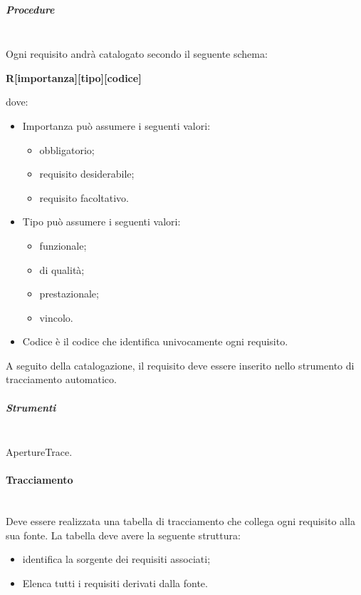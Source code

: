 \subparagraph{Procedure} \hfill \\
Ogni requisito andrà catalogato secondo il seguente schema:

\begin{center}
\textbf{R[importanza][tipo][codice]}
\end{center}
dove:
\begin{itemize}
\item Importanza può assumere i seguenti valori:
\begin{itemize}
\item {}  obbligatorio;
\item {} requisito desiderabile;
\item {} requisito facoltativo.
\end{itemize}
\item Tipo può assumere i seguenti valori:
\begin{itemize}
\item {} funzionale;
\item {} di qualità;
\item {} prestazionale;
\item {} vincolo.
\end{itemize}
\item Codice è il codice che identifica univocamente ogni requisito.
\end{itemize}

A seguito della catalogazione, il requisito deve essere inserito nello strumento di tracciamento automatico.


\subparagraph{Strumenti} \hfill \\
ApertureTrace.

\paragraph{Tracciamento} \hfill \\

Deve essere realizzata una tabella di tracciamento che collega ogni requisito alla sua fonte.
La tabella deve avere la seguente struttura:

\begin{itemize}
\item {} identifica la sorgente dei requisiti associati;
\item {} Elenca tutti i requisiti derivati dalla fonte.
\end{itemize}


